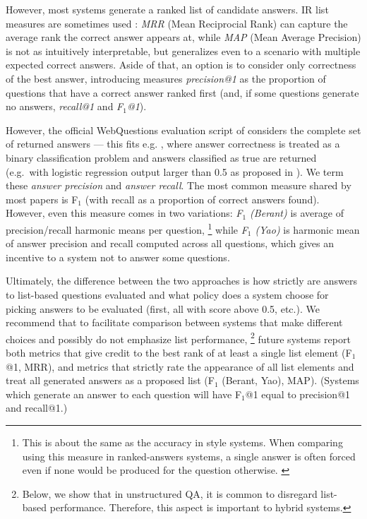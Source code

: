 However, most systems generate a ranked list of candidate answers.
IR list measures are sometimes used \citep{Fader2013Paraphrase,Semantic2014Bordes}:
\textit{MRR} (Mean Reciprocial Rank) can capture the average rank the correct answer appears at,
while \textit{MAP} (Mean Average Precision) is not as intuitively interpretable, but generalizes
even to a scenario with multiple expected correct answers.
Aside of that, an option is to consider only correctness of the best answer,
introducing measures
\textit{precision@1} as the proportion of questions that have a correct answer ranked first
(and, if some questions generate no answers, \textit{recall@1} and \textit{F$_1$@1}).

However, the official WebQuestions evaluation script
of \citep{Semantic2013Berant} considers the complete set
of returned answers --- this fits e.g. \citep{TreeFreebase2014Yao},
where answer correctness is treated as a binary classification problem
and answers classified as true are returned (e.g.\ with logistic regression
output larger than 0.5 as proposed in \cite{FreebaseQA2014Yao}).
We term these \textit{answer precision} and \textit{answer recall}.
The most common measure shared by most papers is F$_1$
(with recall as a proportion of correct answers found).
However, even this measure comes in two variations:
\textit{F$_1$ (Berant)} is average of precision/recall harmonic means per question,%
\footnote{This is about the same as the accuracy in \cite{Semantic2013Berant} style systems.
When comparing using this measure in ranked-answers systems,
a single answer is often forced even if none would be produced for the question otherwise. \citep{FreebaseQA2014Yao}}
while \textit{F$_1$ (Yao)} is harmonic mean of answer precision and recall computed across all questions,
which gives an incentive to a system not to answer some questions.

Ultimately, the difference between the two approaches is how strictly are answers
to list-based questions evaluated and what policy does a system choose for
picking answers to be evaluated (first, all with score above 0.5, etc.).
We recommend that to facilitate comparison between systems that make different choices
and possibly do not emphasize list performance,%
\footnote{Below, we show that in unstructured QA, it is common to disregard list-based performance.
Therefore, this aspect is important to hybrid systems.}
future systems report both metrics that give credit to the best rank of at least
a single list element (F$_1$@1, MRR), and metrics that strictly rate the appearance
of all list elements and treat all generated answers as a proposed list (F$_1$ (Berant, Yao), MAP).
(Systems which generate an answer to each question will have F$_1$@1 equal
to precision@1 and recall@1.)

